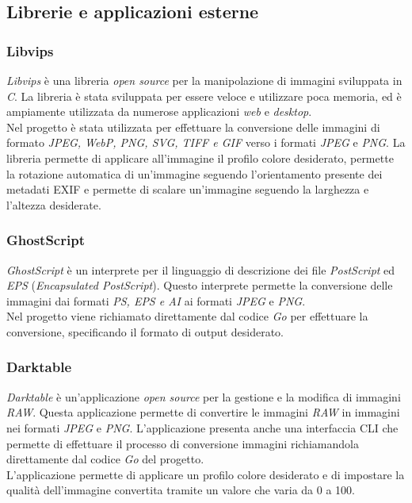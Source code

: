\subsection{Librerie e applicazioni esterne}

\subsubsection{Libvips}

\emph{Libvips} è una libreria \emph{open source} per la manipolazione di immagini
sviluppata in \emph{C}. La libreria è stata sviluppata per essere veloce e
utilizzare poca memoria, ed è ampiamente utilizzata da numerose applicazioni
\emph{web} e \emph{desktop}. \\
Nel progetto è stata utilizzata per effettuare la conversione delle immagini
di formato \emph{JPEG, WebP, PNG, SVG, TIFF e GIF} verso i formati \emph{JPEG} e
\emph{PNG}. La libreria permette di applicare all'immagine il profilo colore
desiderato, permette la rotazione automatica di un'immagine seguendo
l'orientamento presente dei \glsfirstoccur\gls{metadati}
\glsfirstoccur\gls{EXIF} e permette di scalare un'immagine seguendo la larghezza
e l'altezza desiderate. \cite{libvips}

\subsubsection{GhostScript}

\emph{GhostScript} è un interprete per il linguaggio di descrizione dei file
\emph{PostScript} ed \emph{EPS} (\emph{Encapsulated PostScript}).
Questo interprete permette la conversione delle immagini dai formati \emph{PS,
    EPS e AI} ai formati \emph{JPEG} e
\emph{PNG}. \\
Nel progetto viene richiamato direttamente dal codice \emph{Go} per effettuare
la conversione, specificando il formato di output desiderato. \cite{ghostscript}

\subsubsection{Darktable}

\emph{Darktable} è un'applicazione \emph{open source} per la gestione e la
modifica di immagini \emph{RAW}. Questa applicazione permette di convertire le
immagini \emph{RAW} in immagini nei formati \emph{JPEG} e \emph{PNG}.
L'applicazione presenta anche una interfaccia \glsfirstoccur\gls{CLI} che
permette di effettuare il processo di conversione immagini richiamandola
direttamente dal codice \emph{Go} del progetto.\\
L'applicazione permette di applicare un profilo colore desiderato e di impostare
la qualità dell'immagine convertita tramite un valore che varia da 0 a 100. \cite{darktable}

